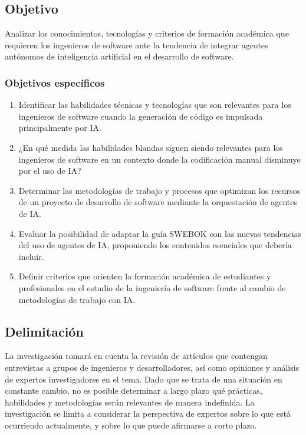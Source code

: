 \documentclass[12pt, letterpaper]{article}
\begin{document}
\subsection{Objetivo}

Analizar los conocimientos, tecnologías y criterios de formación académica que requieren los ingenieros de software ante la tendencia de integrar agentes autónomos de inteligencia artificial en el desarrollo de software.

\subsubsection{Objetivos específicos}

\begin{enumerate}
    \item Identificar las habilidades técnicas y tecnologías que son relevantes para los ingenieros de software cuando la generación de código es impulsada principalmente por IA.
    \item ¿En qué medida las habilidades blandas siguen siendo relevantes para los ingenieros de software en un contexto donde la codificación manual disminuye por el uso de IA?
    \item Determinar las metodologías de trabajo y procesos que optimizan los recursos de un proyecto de desarrollo de software mediante la orquestación de agentes de IA.
    \item Evaluar la posibilidad de adaptar la guía SWEBOK con las nuevas tendencias del uso de agentes de IA, proponiendo los contenidos esenciales que debería incluir.
    \item Definir criterios que orienten la formación académica de estudiantes y profesionales en el estudio de la ingeniería de software frente al cambio de metodologías de trabajo con IA.
\end{enumerate}


\subsection{Delimitación}

La investigación tomará en cuenta la revisión de artículos que contengan entrevistas a grupos de ingenieros y desarrolladores, así como opiniones y análisis de expertos investigadores en el tema. Dado que se trata de una situación en constante cambio, no es posible determinar a largo plazo qué prácticas, habilidades y metodologías serán relevantes de manera indefinida. La investigación se limita a considerar la perspectiva de expertos sobre lo que está ocurriendo actualmente, y sobre lo que puede afirmarse a corto plazo.


\newpage
\printbibliography[title={Referencias}]
\end{document}
